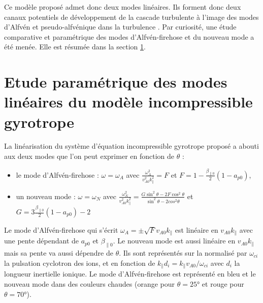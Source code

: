  Ce modèle proposé admet donc deux modes linéaires. Ils forment donc deux canaux potentiels de développement de la cascade turbulente à l'image des modes d'Alfvén et pseudo-alfvénique dans la turbulence . Par curiosité, une étude comparative et paramétrique des modes d'Alfvén-firehose et du nouveau mode a été menée. Elle est résumée dans la section \ref{sec-223}.

\section{Etude paramétrique des modes linéaires du modèle incompressible gyrotrope } \label{sec-223}

 La linéarisation du système d'équation incompressible gyrotrope proposé a abouti aux deux modes que l'on peut exprimer en fonction de $\theta$ : 
 \begin{itemize}
     \item le mode d'Alfvén-firehose : $\omega =  \omega_A$ avec $\frac{\omega^2_A}{v^2_{A0}k^2_{\parallel}} = F $ et $F = 1 - \frac{\beta_{\parallel 0}}{2}(1-a_{p0})$,
     \item un nouveau mode : $\omega = \omega_N$ avec $\frac{\omega^2_N}{v^2_{A0}k^2_{\parallel}} =  \frac{G \sin^2 \theta - 2F \cos^2 \theta}{ \sin^2 \theta - 2 cos^2 \theta} $ et $G =  3\frac{\beta_{\parallel 0}}{2}(1-a_{p0}) -2$
 \end{itemize}
 Le mode d'Alfvén-firehose qui s'écrit $\omega_A = \pm \sqrt{F } v_{A0} k_{\parallel} $ est linéaire en $v_{A0} k_{\parallel}$ avec une pente dépendant de $a_{p0}$ et $\beta_{\parallel 0}$. Le nouveau mode est aussi  linéaire en $v_{A0} k_{\parallel}$  mais sa pente va aussi dépendre de $\theta$.  
 Ils sont représentés sur la   normalisé par $\omega_{ci}$ la pulsation cyclotron des ions, et en fonction de $k_{\parallel}d_i = k_{\parallel} v_{A0}/ \omega_{ci} $ avec $d_i$ la longueur inertielle ionique. Le mode d'Alfvén-firehose est représenté en bleu et le nouveau mode dans des couleurs chaudes (orange pour $\theta = \ang{25}$ et rouge pour $\theta=\ang{70}$).
